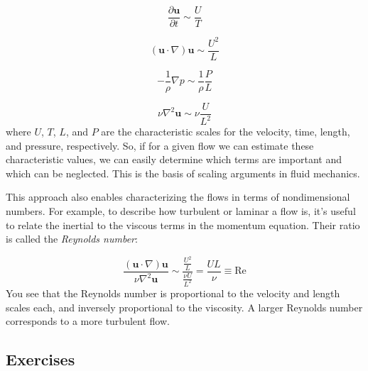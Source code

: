 \documentclass[12pt]{article}
\numberwithin{equation}{section}
\numberwithin{figure}{section}
\numberwithin{table}{section}
\begin{document}
\begin{equation}
  \frac{\partial \mathbf{u}}{\partial t} \sim \frac{U}{T}
\end{equation}

\begin{equation}
  (\mathbf{u} \cdot \nabla) \mathbf{u} \sim \frac{U^2}{L}
\end{equation}

\begin{equation}
  - \frac{1}{\rho} \nabla p \sim \frac{1}{\rho} \frac{P}{L}
\end{equation}

\begin{equation}
  \nu \nabla^2 \mathbf{u} \sim \nu \frac{U}{L^2}
\end{equation}
where $U$, $T$, $L$, and $P$ are the characteristic scales for the velocity,
time, length, and pressure, respectively.
So, if for a given flow we can estimate these characteristic values, we can
easily determine which terms are important and which can be neglected.
This is the basis of scaling arguments in fluid mechanics.

This approach also enables characterizing the flows in terms of
nondimensional numbers.
For example, to describe how turbulent or laminar a flow is, it's useful to
relate the inertial to the viscous terms in the momentum equation.
Their ratio is called the  \textit{Reynolds number}:

\begin{equation}
  \frac{(\mathbf{u} \cdot \nabla) \mathbf{u}}{\nu \nabla^2 \mathbf{u}} \sim
  \frac{\frac{U^2}{L}}{\frac{\nu U}{L^2}} = \frac{UL}{\nu} \equiv \text{Re}
  \label{eq:reynolds_number}
\end{equation}
You see that the Reynolds number is proportional to the velocity and length
scales each, and inversely proportional to the viscosity.
A larger Reynolds number corresponds to a more turbulent flow.

\subsection*{Exercises}
\end{document}
